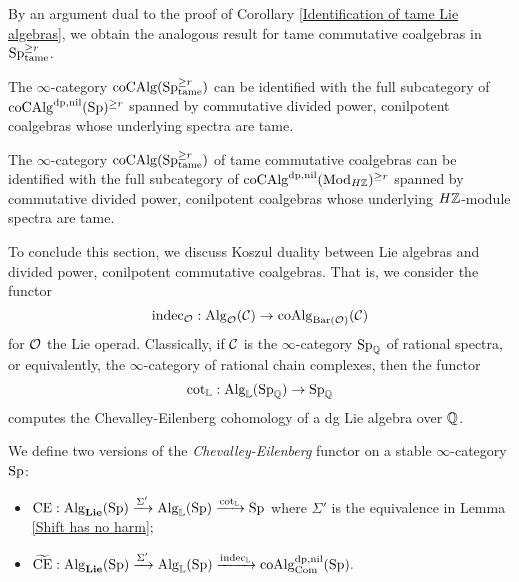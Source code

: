 By an argument dual to the proof of Corollary \ref{Identification of tame Lie algebras}, we obtain the analogous result for tame commutative coalgebras in $\operatorname{Sp}^{\geq r}_{\operatorname{\operatorname{tame}}}$. 
\begin{corollary}
\label{Identification of tame dp,nil coalgebras}
    The $\infty$-category $\operatorname{coCAlg}(\operatorname{Sp}^{\geq r}_{\operatorname{\operatorname{tame}}})$ can be identified with the full subcategory of $\operatorname{coCAlg}^{\operatorname{dp}, \operatorname{nil}}(\operatorname{Sp})^{\geq r}$ spanned by commutative divided power, conilpotent coalgebras whose underlying spectra are tame.
\end{corollary}

\begin{remark}
\label{Identification of tame commutative coalgebras in Mod_HZ}
    The $\infty$-category $\operatorname{coCAlg}(\operatorname{Sp}^{\geq r}_{\operatorname{\operatorname{tame}}})$ of tame commutative coalgebras can be identified with the full subcategory of $\operatorname{coCAlg}^{\operatorname{dp}, \operatorname{nil}}(\operatorname{Mod}_{H{\mathbb{Z}}})^{\geq r}$ spanned by commutative divided power, conilpotent coalgebras whose underlying $H{\mathbb{Z}}$-module spectra are tame.
\end{remark}


To conclude this section,
we discuss Koszul duality between Lie algebras and divided power, conilpotent commutative coalgebras.
That is, we consider the functor
$$\operatorname{indec}_{{\mathcal{O}}}: \operatorname{Alg}_{{\mathcal{O}}}({\mathcal{C}})\to \operatorname{coAlg}_{\operatorname{Bar}({\mathcal{O}})}({\mathcal{C}})$$
for ${\mathcal{O}}$ the Lie operad. 
Classically, if ${\mathcal{C}}$ is the $\infty$-category $\operatorname{Sp}_{{\mathbb{Q}}}$ of rational spectra, or equivalently, the $\infty$-category of rational chain complexes, then the functor 
$$
\cot_{{\mathbb{L}}}: \operatorname{Alg}_{{\mathbb{L}}}(\operatorname{Sp}_{{\mathbb{Q}}}) 
\to 
\operatorname{Sp}_{{\mathbb{Q}}}
$$
computes the Chevalley-Eilenberg cohomology of a dg Lie algebra over ${\mathbb{Q}}$. 

\begin{definition}
\label{CChevalley-Eilenberg functor}
  We define two versions of the \emph{Chevalley-Eilenberg} functor on a stable $\infty$-category $\operatorname{Sp}$:
    \begin{itemize}
        \item  
        $
        \operatorname{CE}: \operatorname{Alg}_{\mathbf{Lie}}(\operatorname{Sp})\xrightarrow{\Sigma'} \operatorname{Alg}_{{\mathbb{L}}}(\operatorname{Sp})
        \xrightarrow{\cot_{{\mathbb{L}}}}
        \operatorname{Sp}
        $
        where $\Sigma'$ is the equivalence in Lemma \ref{Shift has no harm};
        \item $
        \widetilde{\operatorname{CE}}: \operatorname{Alg}_{\mathbf{Lie}}(\operatorname{Sp})\xrightarrow{\Sigma'} \operatorname{Alg}_{{\mathbb{L}}}(\operatorname{Sp})
        \xrightarrow{\operatorname{indec}_{{\mathbb{L}}}}
        \operatorname{coAlg}^{\operatorname{dp}, \operatorname{nil}}_{\operatorname{Com}}(\operatorname{Sp}).
        $
    \end{itemize}
\end{definition}

